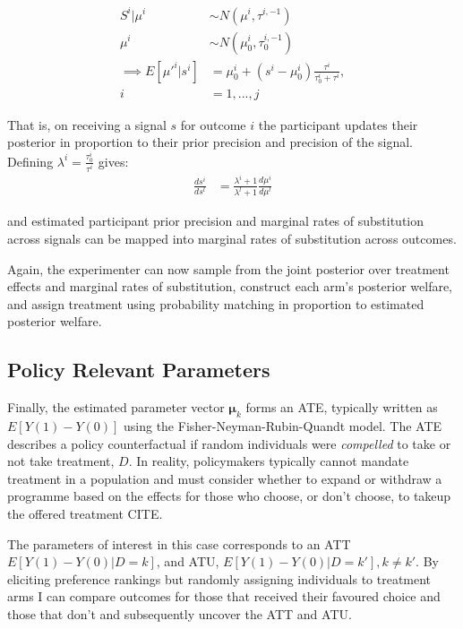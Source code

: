 \documentclass[twoside,11pt]{article}
\begin{document}
\begin{align*}
    S^i  | \mu^i  &\sim N\left(\mu^i, \tau^{i,-1}\right) \\
    \mu^i &\sim N\left(\mu^i_0, \tau_0^{i,-1}\right) \\
    \implies E[\mu'^{i} | s^{i} ]   &= \mu^i_0 + (s^i - \mu^i_0) \frac{\tau^i}{\tau^i_0 + \tau^i}, 
    \\ i &= 1, ..., j 
\end{align*}
   
That is, on receiving a signal $s$ for outcome $i$ the participant updates their
 posterior in proportion to their prior precision and precision of the signal. 
 Defining $\lambda^i = \frac{\tau^i_0}{\tau^i}$ gives:
 \begin{align*}
   \frac{ds^i}{ds^l} &= \frac{\lambda^i + 1}{\lambda^l + 1} \frac{d\mu^i}{d\mu^l}
 \end{align*}

and estimated participant prior precision and marginal rates of substitution 
across signals can be mapped into marginal rates of substitution across outcomes.


Again, the experimenter can now sample from 
the joint posterior over treatment effects and marginal rates of substitution, 
construct each arm's posterior welfare, and assign treatment using probability 
matching in proportion to estimated posterior welfare.

\subsection{Policy Relevant Parameters}

Finally, the estimated parameter vector $\bm{\mu}_k$ forms an ATE, typically 
written as $E[Y(1) - Y(0)]$ using the Fisher-Neyman-Rubin-Quandt model. The 
ATE describes a policy counterfactual if random individuals were \textit{compelled}
to take or not take treatment, $D$. In reality, policymakers typically cannot 
mandate treatment in a population and must consider whether to expand or 
withdraw a programme based on the effects for those who choose, or don't choose, 
to takeup the offered treatment CITE.

The parameters of interest in this case corresponds to an ATT $E[Y(1) - Y(0) | D = k]$, 
and ATU, $E[Y(1) - Y(0) | D = k'], k \neq k'$. By eliciting preference rankings 
but randomly assigning individuals to treatment arms I can compare outcomes 
for those that received their favoured choice and those that don't and subsequently 
uncover the ATT and ATU.
\end{document}
